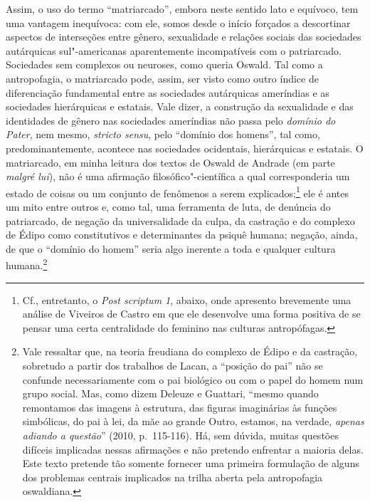 Assim, o uso do termo ``matriarcado'', embora neste sentido lato e
equívoco, tem uma vantagem inequívoca: com ele, somos desde o início
forçados a descortinar aspectos de interseções entre gênero, sexualidade
e relações sociais das sociedades autárquicas sul"-americanas
aparentemente incompatíveis com o patriarcado. Sociedades sem complexos
ou neuroses, como queria Oswald. Tal como a antropofagia, o matriarcado
pode, assim, ser visto como outro índice de diferenciação fundamental
entre as sociedades autárquicas ameríndias e as sociedades hierárquicas
e estatais. Vale dizer, a construção da sexualidade e das identidades de
gênero nas sociedades ameríndias não passa pelo \emph{domínio do Pater},
nem mesmo, \emph{stricto sensu}, pelo ``domínio dos homens'', tal como,
predominantemente, acontece nas sociedades ocidentais, hierárquicas e
estatais. O matriarcado, em minha leitura dos textos de Oswald de
Andrade (em parte \emph{malgré lui}), não é uma afirmação
filosófico"-científica a qual corresponderia um estado de coisas ou um
conjunto de fenômenos a serem explicados;\footnote{Cf., entretanto, o
  \emph{Post scriptum 1}, abaixo, onde apresento brevemente uma análise de
  Viveiros de Castro em que ele desenvolve uma forma positiva de se
  pensar uma certa centralidade do feminino nas culturas antropófagas.}
ele é antes um mito entre outros e, como tal, uma ferramenta de
luta, de denúncia do patriarcado, de negação da universalidade da
culpa, da castração e do complexo de Édipo como constitutivos e
determinantes da psiquê humana; negação, ainda, de que o ``domínio do
homem'' seria algo inerente a toda e qualquer cultura humana.\footnote{Vale
  ressaltar que, na teoria freudiana do complexo de Édipo e da
  castração, sobretudo a partir dos trabalhos de Lacan, a ``posição do
  pai'' não se confunde necessariamente com o pai biológico ou com o
  papel do homem num grupo social. Mas, como dizem Deleuze e Guattari,
  ``mesmo quando remontamos das imagens à estrutura,
  das figuras imaginárias às funções simbólicas, do pai à lei, da mãe ao
  grande Outro, estamos, na verdade, \emph{apenas adiando a questão}'' (2010, p.~115-116).
  Há, sem dúvida, muitas questões difíceis implicadas nessas afirmações
  e não pretendo enfrentar a maioria delas. Este texto pretende tão
  somente fornecer uma primeira formulação de alguns dos problemas
  centrais implicados na trilha aberta pela antropofagia oswaldiana.}

